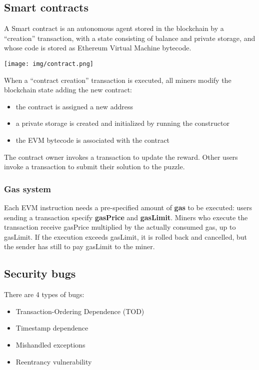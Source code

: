 \documentclass[a4paper, 10pt, titlepage]{article}
\begin{document}
\subsection{Smart contracts}
A Smart contract is an autonomous agent stored in the blockchain by a “creation” transaction, with a state consisting of balance and private storage, and whose code is stored as Ethereum Virtual Machine bytecode. 
\begin{center}
\texttt{[image: img/contract.png]}
\end{center}
When a “contract creation” transaction is executed, all miners modify the blockchain state adding the new contract: 
\begin{itemize}
\item the contract is assigned a new address
\item a private storage is created and initialized by running the constructor
\item the EVM bytecode is associated with the contract
\end{itemize} 
The contract owner invokes a transaction to update the reward. Other users invoke a transaction to submit their solution to the puzzle.

\subsubsection{Gas system}
Each EVM instruction needs a pre-specified amount of \textbf{gas} to be executed: users sending a transaction specify \textbf{gasPrice} and \textbf{gasLimit}.
Miners who execute the transaction receive gasPrice multiplied by the actually consumed gas, up to gasLimit. If the execution exceeds gasLimit, it is rolled back and cancelled, but the sender has still to pay gasLimit to the miner.

\subsection{Security bugs}
There are 4 types of bugs:
\begin{itemize}
\item Transaction-Ordering Dependence (TOD)
\item Timestamp dependence
\item Mishandled exceptions
\item Reentrancy vulnerability
\end{itemize}
\end{document}
